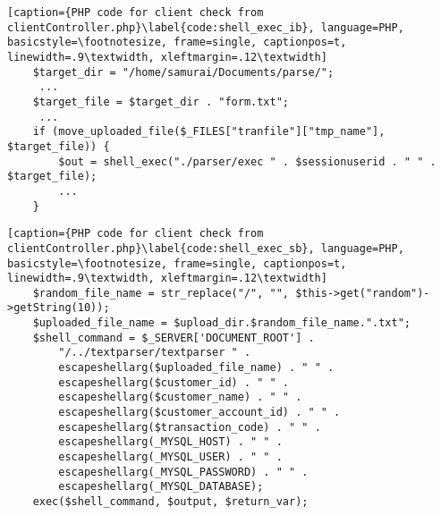 \begin{lstlisting}[caption={PHP code for client check from clientController.php}\label{code:shell_exec_ib}, language=PHP, basicstyle=\footnotesize, frame=single, captionpos=t, linewidth=.9\textwidth, xleftmargin=.12\textwidth]
    $target_dir = "/home/samurai/Documents/parse/";
     ...
    $target_file = $target_dir . "form.txt";
     ...
    if (move_uploaded_file($_FILES["tranfile"]["tmp_name"], $target_file)) {
        $out = shell_exec("./parser/exec " . $sessionuserid . " " . $target_file);
        ...
    }
\end{lstlisting}

\begin{lstlisting}[caption={PHP code for client check from clientController.php}\label{code:shell_exec_sb}, language=PHP, basicstyle=\footnotesize, frame=single, captionpos=t, linewidth=.9\textwidth, xleftmargin=.12\textwidth]
    $random_file_name = str_replace("/", "", $this->get("random")->getString(10));
    $uploaded_file_name = $upload_dir.$random_file_name.".txt";
    $shell_command = $_SERVER['DOCUMENT_ROOT'] .
        "/../textparser/textparser " .
        escapeshellarg($uploaded_file_name) . " " .
        escapeshellarg($customer_id) . " " .
        escapeshellarg($customer_name) . " " .
        escapeshellarg($customer_account_id) . " " .
        escapeshellarg($transaction_code) . " " .
        escapeshellarg(_MYSQL_HOST) . " " .
        escapeshellarg(_MYSQL_USER) . " " .
        escapeshellarg(_MYSQL_PASSWORD) . " " .
        escapeshellarg(_MYSQL_DATABASE);
    exec($shell_command, $output, $return_var);
\end{lstlisting}
\clearpage